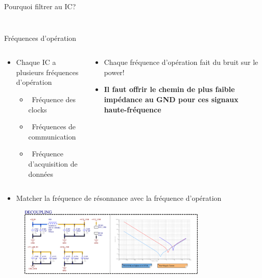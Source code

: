 \begin{frame}{Pourquoi filtrer au IC?}
\begin{columns}
\begin{column}{0.45\textwidth}
\begin{figure}
            \end{figure}
        \end{column}
    \end{columns}
\end{frame}

\begin{frame}{Fréquences d'opération}
    \begin{columns}
        \begin{column}{0.5\textwidth}
            \begin{itemize}
                \item Chaque IC a plusieurs fréquences d'opération
                \begin{itemize}
                    \item[] \hspace{-20pt}\textcolor{UDSgreenFierte}{\faWaveSquare}
                        ~Fréquence des clocks
                    \item[] \hspace{-20pt}\textcolor{UDSgreenFierte}{\faNetworkWired}
                        ~Fréquences de communication
                    \item[] \hspace{-20pt}\textcolor{UDSgreenFierte}{\faRuler}
                        ~Fréquence d'acquisition de données
                \end{itemize}
            \end{itemize}
        \end{column}
        \begin{column}{0.55\textwidth}
            \begin{itemize}
                \item Chaque fréquence d'opération fait du bruit sur le power!
                \item \textbf{Il faut offrir le chemin de plus faible impédance au GND pour ces signaux haute-fréquence}
            \end{itemize}
        \end{column}
    \end{columns}
    \vspace{12pt}
    \pause
    \begin{itemize}
        \item Matcher la fréquence de résonnance avec la fréquence d'opération
    \end{itemize}

    \begin{figure}
        \includegraphics[width=0.8\textwidth, height=0.4\textheight, keepaspectratio]{pictures/decoupling-example-usb.png}
    \end{figure}
\end{frame}

